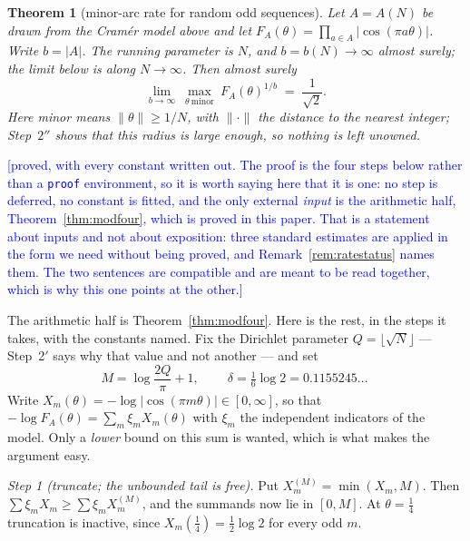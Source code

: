 \documentclass[11pt,a4paper]{article}
\theoremstyle{plain}
\newtheorem{theorem}{Theorem}[section]
\theoremstyle{definition}
\theoremstyle{remark}
\newcommand{\STATUS}[1]{\textcolor{blue}{\textsf{[#1]}}}
\begin{document}
\begin{theorem}[minor-arc rate for random odd sequences]\label{prop:rate}
Let $A=A(N)$ be drawn from the Cram\'er model above and let
$F_A(\theta)=\prod_{a\in A}|\cos(\pi a\theta)|$. Write $b=|A|$. The running parameter is
$N$, and $b=b(N)\to\infty$ almost surely; the limit below is along $N\to\infty$. Then almost
surely
\[
   \lim_{b\to\infty}\ \max_{\theta\ \mathrm{minor}}\ F_A(\theta)^{1/b}\;=\;\frac1{\sqrt2}.
\]
Here \emph{minor} means $\|\theta\|\ge1/N$, with $\|\cdot\|$ the distance to the nearest integer;
Step~$2''$ shows that this radius is large enough, so nothing is left unowned.
\end{theorem}

\STATUS{proved, with every constant written out. The proof is the four steps below rather
than a \texttt{proof} environment, so it is worth saying here that it is one: no step is
deferred, no constant is fitted, and the only external \emph{input} is the arithmetic half,
Theorem~\ref{thm:modfour}, which is proved in this paper. That is a statement about inputs
and not about exposition: three standard estimates are applied in the form we need without
being proved, and Remark~\ref{rem:ratestatus} names them. The two sentences are compatible
and are meant to be read together, which is why this one points at the other.}

The arithmetic half is Theorem~\ref{thm:modfour}. Here is the rest, in the steps it
takes, with the constants named. Fix the Dirichlet parameter $Q=\lfloor\sqrt N\rfloor$
--- Step~2$'$ says why that value and not another --- and set
\[
   M=\log\frac{2Q}{\pi}+1,\qquad
   \boxed{\ \delta=\tfrac16\log 2=0.1155245\ldots\ }
\]
Write $X_m(\theta)=-\log|\cos(\pi m\theta)|\in[0,\infty]$, so that
$-\log F_A(\theta)=\sum_m\xi_mX_m(\theta)$ with $\xi_m$ the independent indicators of the
model. Only a \emph{lower} bound on this sum is wanted, which is what makes the argument easy.

\emph{Step 1 (truncate; the unbounded tail is free).} Put $X^{(M)}_m=\min(X_m,M)$. Then
$\sum\xi_mX_m\ge\sum\xi_mX^{(M)}_m$, and the summands now lie in $[0,M]$. At $\theta=\tfrac14$
truncation is inactive, since $X_m(\tfrac14)=\tfrac12\log2$ for every odd $m$.
\end{document}
